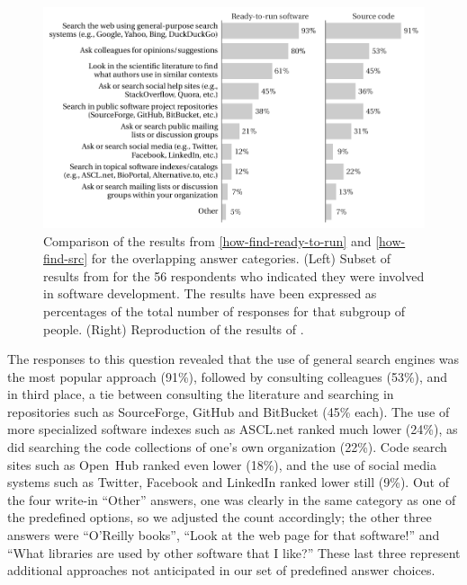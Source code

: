 \documentclass{casicswhitepaper}
\newcommand{\totalDevelopers}{56\xspace}
\begin{document}
\begin{figure}[b]
  \centering
  \includegraphics{files/plots/compare-how-find-v2.pdf}
  \vspace*{-1ex}
  \caption{Comparison of the results from \ref{how-find-ready-to-run} and \ref{how-find-src} for the overlapping answer categories. (Left) Subset of results from  for the \totalDevelopers respondents who indicated they were involved in software development.  The results have been expressed as percentages of the total number of responses for that subgroup of people.  (Right) Reproduction of the results of .}
  \label{compare-how-find}
\end{figure}


%

The responses to this question revealed that the use of general search engines was the most popular approach (91\%), followed by consulting colleagues (53\%), and in third place, a tie between consulting the literature and searching in repositories such as SourceForge, GitHub and BitBucket (45\% each).  The use of more specialized software indexes such as ASCL.net ranked much lower (24\%), as did searching the code collections of one's own organization (22\%).  Code search sites such as Open~Hub ranked even lower (18\%), and the use of social media systems such as Twitter, Facebook and LinkedIn ranked lower still (9\%).  Out of the four write-in ``Other'' answers, one was clearly in the same category as one of the predefined options, so we adjusted the count accordingly; the other three answers were ``O'Reilly books'', ``Look at the web page for that software!'' and ``What libraries are used by other software that I like?''  These last three represent additional approaches not anticipated in our set of predefined answer choices.
\end{document}

